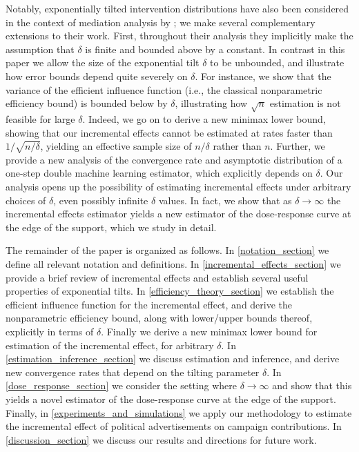 \documentclass[11pt,twoside]{article}
\theoremstyle{definition}
\theoremstyle{remark}
\begin{document}
Notably, exponentially tilted intervention distributions have also been considered in the context of mediation analysis by \cite{diaz2020causal}; we make several complementary extensions to their work. First, throughout their analysis they implicitly make the assumption that $\delta$ is finite and bounded above by a constant. In contrast in this paper we allow the size of the exponential tilt $\delta$ to be unbounded, and illustrate how error bounds depend quite severely on $\delta$.  For instance, we show that the variance of the efficient influence function (i.e., the classical nonparametric efficiency bound) is bounded below by $\delta$, illustrating how $\sqrt{n}$ estimation is not feasible for large $\delta$. Indeed, we go on to derive a new minimax lower bound, showing that our incremental effects cannot be estimated at rates faster than $1/\sqrt{n/\delta}$, yielding an effective sample size of $n/\delta$ rather than $n$. Further, we provide a new analysis of the convergence rate and asymptotic distribution of a one-step double machine learning estimator, which explicitly depends on $\delta$. Our analysis opens up the possibility of estimating incremental effects under arbitrary choices of $\delta$, even possibly infinite $\delta$ values. In fact, we show that as $\delta \to \infty$ the incremental effects estimator yields a new estimator of the dose-response curve at the edge of the support, which we study in detail.

The remainder of the paper is organized as follows. In \cref{notation_section} we define all relevant notation and definitions. In \cref{incremental_effects_section} we provide a brief review of incremental effects and establish several useful properties of exponential tilts. In \cref{efficiency_theory_section} we establish the efficient influence function for the incremental effect, and derive the nonparametric efficiency bound, along with lower/upper bounds thereof, explicitly in terms of $\delta$. Finally we derive a new minimax lower bound for estimation of the incremental effect, for arbitrary $\delta$. In \cref{estimation_inference_section} we discuss estimation and inference, and derive new convergence rates that depend on the tilting parameter $\delta$. In \cref{dose_response_section} we consider the setting where $\delta \to \infty$ and show that this yields a novel estimator of the dose-response curve at the edge of the support. Finally, in \cref{experiments_and_simulations} we apply our methodology to estimate the incremental effect of political advertisements on campaign contributions. In \cref{discussion_section} we discuss our results and directions for future work.
\end{document}
